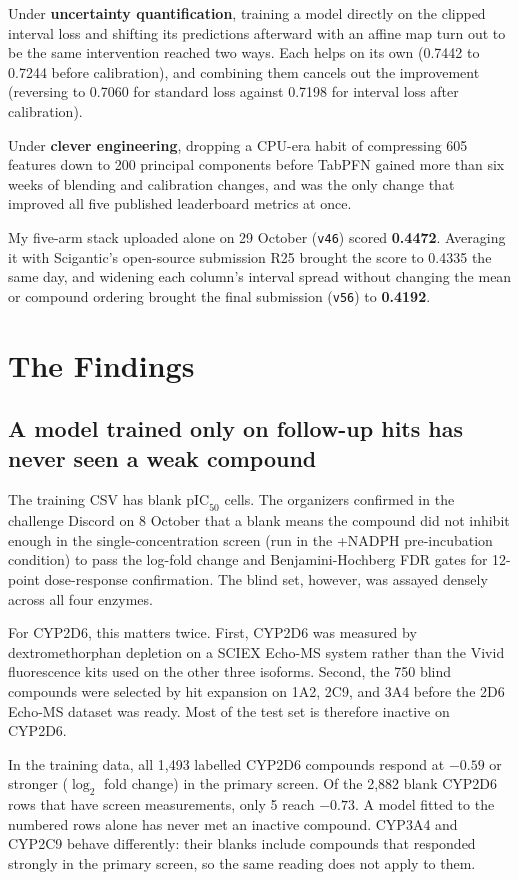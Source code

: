 \documentclass[11pt]{article}
\begin{document}
Under \textbf{uncertainty quantification}, training a model directly on the clipped interval loss and shifting its predictions afterward with an affine map turn out to be the same intervention reached two ways. Each helps on its own (0.7442 to 0.7244 before calibration), and combining them cancels out the improvement (reversing to 0.7060 for standard loss against 0.7198 for interval loss after calibration).

Under \textbf{clever engineering}, dropping a CPU-era habit of compressing 605 features down to 200 principal components before TabPFN gained more than six weeks of blending and calibration changes, and was the only change that improved all five published leaderboard metrics at once.

My five-arm stack uploaded alone on 29 October (\texttt{v46}) scored \textbf{0.4472}. Averaging it with Scigantic's open-source submission R25 brought the score to 0.4335 the same day, and widening each column's interval spread without changing the mean or compound ordering brought the final submission (\texttt{v56}) to \textbf{0.4192}.

\section{The Findings}

\subsection{A model trained only on follow-up hits has never seen a weak compound}
The training CSV has blank $\text{pIC}_{50}$ cells. The organizers confirmed in the challenge Discord on 8 October that a blank means the compound did not inhibit enough in the single-concentration screen (run in the +NADPH pre-incubation condition) to pass the log-fold change and Benjamini-Hochberg FDR gates for 12-point dose-response confirmation. The blind set, however, was assayed densely across all four enzymes.

For CYP2D6, this matters twice. First, CYP2D6 was measured by dextromethorphan depletion on a SCIEX Echo-MS system rather than the Vivid fluorescence kits used on the other three isoforms. Second, the 750 blind compounds were selected by hit expansion on 1A2, 2C9, and 3A4 before the 2D6 Echo-MS dataset was ready. Most of the test set is therefore inactive on CYP2D6.

In the training data, all 1,493 labelled CYP2D6 compounds respond at $-0.59$ or stronger ($\log_2$ fold change) in the primary screen. Of the 2,882 blank CYP2D6 rows that have screen measurements, only 5 reach $-0.73$. A model fitted to the numbered rows alone has never met an inactive compound. CYP3A4 and CYP2C9 behave differently: their blanks include compounds that responded strongly in the primary screen, so the same reading does not apply to them.
\end{document}
